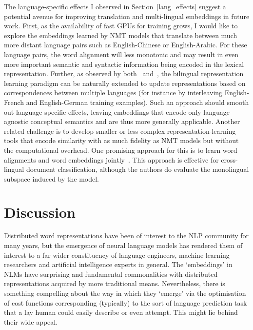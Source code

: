 The language-specific effects I observed in Section~\ref{lang_effects} suggest a potential avenue for improving translation and multi-lingual embeddings in future work. First, as the availability of fast GPUs for training grows, I would like to explore the embeddings learned by NMT models that translate between much more distant language pairs such as English-Chinese or English-Arabic. For these language pairs, the word alignment will less monotonic and may result in even more important semantic and syntactic information being encoded in the lexical representation. Further,  as observed by both~\cite{Hermann:2014:ICLR} and~\cite{faruqui2014improving}, the bilingual representation learning paradigm can be naturally extended to update representations based on correspondences between multiple languages (for instance by interleaving English-French and English-German training examples). Such an approach should smooth out language-specific effects, leaving embeddings that encode only language-agnostic conceptual semantics and are thus more generally applicable. Another related challenge is to develop smaller or less complex representation-learning tools that encode similarity with as much fidelity as NMT models but without the computational overhead. One promising approach for this is to learn word alignments and word embeddings jointly~\citep{Kocisky:2014}. This approach is effective for cross-lingual document classification, although the authors do evaluate the monolingual subspace induced by the model.

\section{Discussion}

Distributed word representations have been of interest to the NLP community for many years, but the emergence of neural language models has rendered them of interest to a far wider constituency of language engineers, machine learning researchers and artificial intelligence experts in general. The `embeddings' in NLMs have surprising and fundamental commonalities with distributed representations acquired by more traditional means. Nevertheless, there is something compelling about the way in which they `emerge' via the optimisation of cost functions corresponding (typically) to the sort of language prediction task that a lay human could easily describe or even attempt. This might lie behind their wide appeal.  

